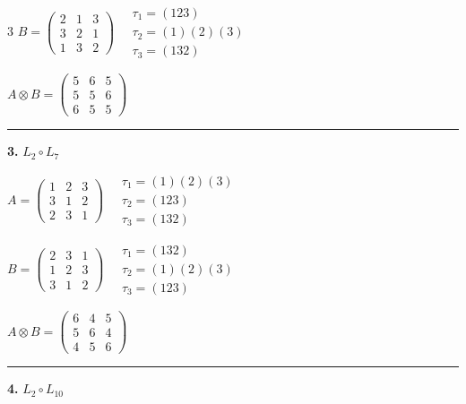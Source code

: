 \begin{multicols}{3}
$B = \begin{pmatrix} 2 & 1 & 3 \\ 3 & 2 & 1 \\ 1 & 3 & 2 \end{pmatrix} \quad \begin{matrix} \tau_{1}=(1 2 3) \\ \tau_{2}=(1)(2)(3) \\ \tau_{3}=(1 3 2) \end{matrix}$

$A \otimes B = \begin{pmatrix} 5 & 6 & 5 \\ 5 & 5 & 6 \\ 6 & 5 & 5 \end{pmatrix}$

\vspace{0.3em}
\hrule
\vspace{0.3em}

\noindent\textbf{3.} $L_{2} \circ L_{7}$

$A = \begin{pmatrix} 1 & 2 & 3 \\ 3 & 1 & 2 \\ 2 & 3 & 1 \end{pmatrix} \quad \begin{matrix} \tau_{1}=(1)(2)(3) \\ \tau_{2}=(1 2 3) \\ \tau_{3}=(1 3 2) \end{matrix}$

$B = \begin{pmatrix} 2 & 3 & 1 \\ 1 & 2 & 3 \\ 3 & 1 & 2 \end{pmatrix} \quad \begin{matrix} \tau_{1}=(1 3 2) \\ \tau_{2}=(1)(2)(3) \\ \tau_{3}=(1 2 3) \end{matrix}$

$A \otimes B = \begin{pmatrix} 6 & 4 & 5 \\ 5 & 6 & 4 \\ 4 & 5 & 6 \end{pmatrix}$

\vspace{0.3em}
\hrule
\vspace{0.3em}

\noindent\textbf{4.} $L_{2} \circ L_{10}$


\end{multicols}
